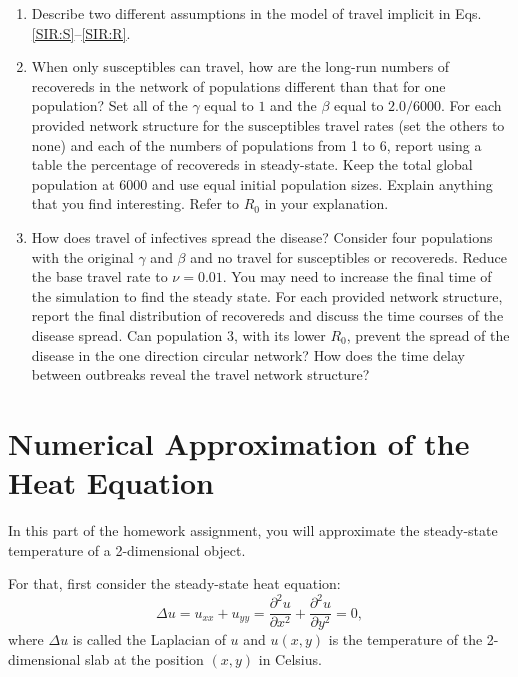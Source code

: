 \documentclass[letter]{article}
\begin{document}
\begin{enumerate}[label=\textbf{\arabic*.}]
	\item Describe two different assumptions in the model of travel implicit in Eqs. \eqref{SIR:S}--\eqref{SIR:R}.

	\item When only susceptibles can travel, how are the long-run numbers of recovereds in the network of populations different than that for one population? Set all of the $\gamma$ equal to $1$ and the $\beta$ equal to $2.0/6000$. For each provided network structure for the susceptibles travel rates (set the others to none) and each of the numbers of populations from 1 to 6, report using a table the percentage of recovereds in steady-state. Keep the total global population at 6000 and use equal initial population sizes. Explain anything that you find interesting. Refer to $R_0$ in your explanation.
		
	\item How does travel of infectives spread the disease? Consider four populations with the original $\gamma$ and $\beta$ and no travel for susceptibles or recovereds. Reduce the base travel rate to $\nu = 0.01$. You may need to increase the final time of the simulation to find the steady state. For each provided network structure, report the final distribution of recovereds and discuss the time courses of the disease spread. Can population 3, with its lower $R_0$, prevent the spread of the disease in the one direction circular network? How does the time delay between outbreaks reveal the travel network structure?
	


	
	
\end{enumerate}

\newpage

\section{Numerical Approximation of the Heat Equation}

In this part of the homework assignment, you will approximate the steady-state temperature of a 2-dimensional object.

For that, first consider the steady-state heat equation:
\begin{equation}\tag{H}\label{HeatEq}
	\Delta u = u_{xx} + u_{yy} = \frac{\partial^2 u}{\partial x^2} + \frac{\partial^2 u}{\partial y^2} = 0,
\end{equation}
where $\Delta u$ is called the Laplacian of $u$ and $u(x,y)$ is the temperature of the 2-dimensional slab at the position $(x,y)$ in Celsius.
\end{document}
